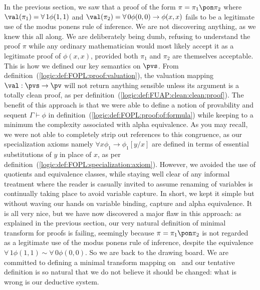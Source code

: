 In the previous section, we saw that a proof of the form
$\pi=\pi_{1}\pon\pi_{2} $ where $\val(\pi_{1})=\forall\,1\phi(1,1)$
and $\val(\pi_{2})=\forall\,0\phi(0,0)\to\phi(x,x)$ fails to be a
legitimate use of the modus ponens rule of inference. We are not
discovering anything, as we knew this all along. We are deliberately
being dumb, refusing to understand the proof $\pi$ while any
ordinary mathematician would most likely accept it as a legitimate
proof of $\phi(x,x)$, provided both $\pi_{1}$ and $\pi_{2}$ are
themselves acceptable. This is how we defined our key semantics on
$\pvs$. From definition~(\ref{logic:def:FOPL:proof:valuation}), the
valuation mapping $\val:\pvs\to\pv$ will not return anything
sensible unless its argument is a totally clean proof, as per
definition~(\ref{logic:def:FUAP:clean:clean:proof}). The benefit of
this approach is that we were able to define a notion of provability
and sequent $\Gamma\vdash\phi$  in
definition~(\ref{logic:def:FOPL:proof:of:formula}) while keeping to
a minimum the complexity associated with alpha equivalence. 
As you may recall, we were not able to completely strip
out references to this congruence, as our specialization axioms
namely $\forall x\phi_{1}\to\phi_{1}[y/x]$ are defined in terms of
essential substitutions of $y$ in place of $x$, as per
definition~(\ref{logic:def:FOPL:specialization:axiom}). However, we
avoided the use of quotients and equivalence classes, while staying
well clear of any informal treatment where the reader is casually
invited to assume renaming of variables is continually taking place
to avoid variable capture. In short, we kept it simple but without
waving our hands on variable binding, capture and
alpha equivalence. It is all very nice, but we have now
discovered a major flaw in this approach: as explained in the
previous section, our very natural definition of minimal transform
for proofs is failing, seemingly because $\pi=\pi_{1}\pon\pi_{2}$ is
not regarded as a legitimate use of the modus ponens rule of
inference, despite the equivalence
$\forall\,1\phi(1,1)\sim\forall\,0\phi(0,0)$. So we are back to the
drawing board. We are committed to defining a minimal transform
mapping on \pvs\ and our tentative definition is so natural that we
do not believe it should be changed: what is wrong is our deductive
system.

